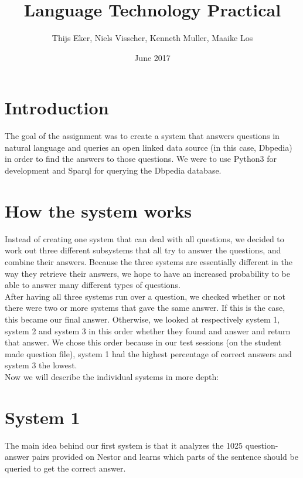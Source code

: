 \documentclass{article}
\title{Language Technology Practical}
\author{Thijs Eker, Niels Visscher, Kenneth Muller, Maaike Los }
\date{June 2017}
\begin{document}
\maketitle

\section{Introduction}

The goal of the assignment was to create a system that answers questions in natural language and queries an open linked data source (in this case, Dbpedia) in order to find the answers to those questions. We were to use Python3 for development and Sparql for querying the Dbpedia database.

\section{How the system works}
Instead of creating one system that can deal with all questions, we decided to work out three different subsystems that all try to answer the questions, and combine their answers. Because the three systems are essentially different in the way they retrieve their answers, we hope to have an increased probability to be able to answer many different types of questions. \\
After having all three systems run over a question, we checked whether or not there were two or more systems that gave the same answer. If this is the case, this became our final answer. Otherwise, we looked at respectively system 1, system 2 and system 3 in this order whether they found and answer and return that answer. We chose this order because in our test sessions (on the student made question file), system 1 had the highest percentage of correct answers and system 3 the lowest.\\
Now we will describe the individual systems in more depth:

\section*{System 1}
The main idea behind our first system is that it analyzes the 1025 question-answer pairs provided on Nestor and learns which parts of the sentence should be queried to get the correct answer.
\end{document}
